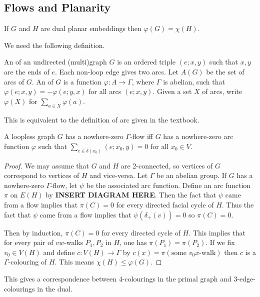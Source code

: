 \documentclass[main.tex]{subfiles}
\begin{document}
\subsection{Flows and Planarity}
\begin{theorem}
  If $G$ and $H$ are dual planar embeddings then $\varphi(G) = \chi(H)$.
\end{theorem}
We need the following definition.
\begin{definition*}
  An  of an undirected (multi)graph $G$ is an ordered triple
  $(e;x,y)$ such that $x,y$ are the ends of $e$.
  Each non-loop edge gives two arcs.
  Let $A(G)$ be the set of arcs of $G$.
  An  of $G$ is a function $\varphi:A\to\Gamma$,
  where $\Gamma$ is abelian, such that $\varphi(e;x,y) = -\varphi(e;y,x)$ for all
  arcs $(e;x,y)$.
  Given a set $X$ of arcs, write $\varphi(X)$ for $\sum_{a\in X}\varphi(a)$.
\end{definition*}
This is equivalent to the definition of arc given in the textbook.
\begin{exercise*}
  A loopless graph $G$ has a nowhere-zero $\Gamma$-flow iff $G$ has a
  nowhere-zero arc function $\varphi$ such that
  $\sum_{e\in\delta(x_0)}(e;x_0,y) = 0$ for all $x_0\in V$.
\end{exercise*}
\begin{proof}
  We may assume that $G$ and $H$ are 2-connected, so vertices of $G$ correspond
  to vertices of $H$ and vice-versa.
  Let $\Gamma$ be an abelian group.
  If $G$ has a nowhere-zero $\Gamma$-flow, let $\psi$ be the associated arc
  function.
  Define an arc function $\pi$ on $E(H)$ by \textbf{INSERT DIAGRAM HERE}.
  Then the fact that $\psi$ came from a flow implies that $\pi(C) = 0$ for
  every directed facial cycle of $H$.
  Thus the fact that $\psi$ came from a flow implies that $\psi(\delta_+(v)) = 0$
  so $\pi(C) = 0$.

  Then by induction, $\pi(C) = 0$ for every directed cycle of $H$.
  This implies that for every pair of $vw$-walks $P_1,P_2$ in $H$,
  one has $\pi(P_1) = \pi(P_2)$.
  If we fix $v_0\in V(H)$ and define $c:V(H)\to\Gamma$ by
  $c(x) = \pi(\text{some $v_0x$-walk})$ then $c$ is a $\Gamma$-colouring of $H$.
  This means $\chi(H)\leq\varphi(G)$.
\end{proof}
\begin{remark*}
  This gives a correspondence between 4-colourings in the primal graph
  and 3-edge-colourings in the dual.
\end{remark*}
\end{document}
